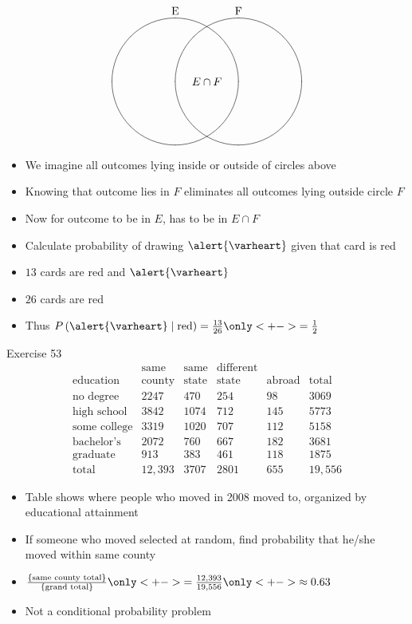 \documentclass[handout]{beamer}
\theoremstyle{definition}
\begin{document}
\begin{frame}
\[\begin{xy}<1cm,0cm>:
(-1,2)*+!D{\text{E}};
(1,2)*+!D{\text{F}};
(-1,0)*\cir<2cm>{};
(1,0)*\cir<2cm>{};
(0,0)*{E\cap F};
\end{xy}\]
\begin{itemize}
\item We imagine all outcomes lying inside
or outside of circles above
\item Knowing that outcome lies in $F$
eliminates all outcomes lying outside circle $F$
\item Now for outcome to be in $E$, has to be in $E\cap F$
\end{itemize}
\end{frame}

\begin{frame}
\begin{example}
\begin{itemize}
\item Calculate probability of drawing $\alert{\varheart}$ given
that card is red
\item $13$ cards are red and $\alert{\varheart}$
\item $26$ cards are red
\item Thus $P\left(\alert{\varheart}\mid\text{red}\right)
=\frac{13}{26}\only<+->{=\frac{1}{2}}$
\end{itemize}
\end{example}
\end{frame}

\begin{frame}{Exercise 53}
\[\begin{array}{r|llll|l}
&\text{same}&\text{same}&\text{different}&&\\
\text{education}&\text{county}
&\text{state}&\text{state}&\text{abroad}&\text{total}\\\hline
\text{no degree}&2247&470&254&98&3069\\
\text{high school}&3842&1074&712&145&5773\\
\text{some college}&3319&1020&707&112&5158\\
\text{bachelor's}&2072&760&667&182&3681\\
\text{graduate}&913&383&461&118&1875\\\hline
\text{total}&12,393&3707&2801&655&19,556
\end{array}\]
\begin{itemize}
\item Table shows where people who moved in 2008
moved to, organized by educational attainment
\item If someone who moved selected at random, find probability
that he/she moved within same county
\item $\frac{\left\{\text{same county total}\right\}}
{\left\{\text{grand total}\right\}}
\only<+->{=\frac{12,393}{19,556}}\only<+->{\approx 0.63}$
\item Not a conditional probability problem
\end{itemize}
\end{frame}
\end{document}
